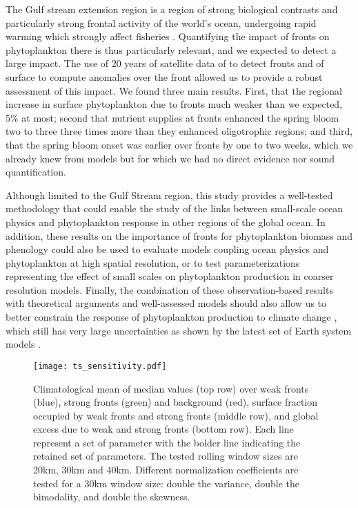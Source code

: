 \conclusions{}

The Gulf stream extension region is a region of strong biological contrasts and particularly strong frontal activity of the world's ocean, undergoing rapid warming which strongly affect fisheries \citep{pershing_2015, neto_2021}.
Quantifying the impact of fronts on phytoplankton there is thus particularly relevant, and we expected to detect a large impact.
The use of 20 years of satellite data of  to detect fronts and of surface  to compute anomalies over the front allowed us to provide a robust assessment of this impact.
We found three main results.
First, that the regional increase in surface phytoplankton due to fronts much weaker than we expected, 5\% at most; second that nutrient supplies at fronts enhanced the spring bloom two to three three times more than they enhanced oligotrophic regions; and third, that the spring bloom onset was earlier over fronts by one to two weeks, which we already knew from models \citep{karleskind_2011, mahadevan_2012} but for which we had no direct evidence nor sound quantification.

Although limited to the Gulf Stream region, this study provides a well-tested methodology that could enable the study of the links between small-scale ocean physics and phytoplankton response in other regions of the global ocean.
In addition, these results on the importance of fronts for phytoplankton biomass and phenology could also be used to evaluate models coupling ocean physics and phytoplankton at high spatial resolution, or to test parameterizations representing the effect of small scales on phytoplankton production in coarser resolution models.
Finally, the combination of these observation-based results with theoretical arguments and well-assessed models should also allow us to better constrain the response of phytoplankton production to climate change \citep{couespel_2021}, which still has very large uncertainties as shown by the latest set of Earth system models \citep{kwiatkowski_2020}.



\appendixfigures{}

\begin{figure*}
 \texttt{[image: ts\_sensitivity.pdf]}
 \caption{
   Climatological mean of  median values (top row) over weak fronts (blue), strong fronts (green) and background (red), surface fraction occupied by weak fronts and strong fronts (middle row), and global  excess due to weak and strong fronts (bottom row).
   Each line represent a set of parameter with the bolder line indicating the retained set of parameters.
   The tested rolling window sizes are 20km, 30km and 40km.
   Different normalization coefficients are tested for a 30km window size: double the variance, double the bimodality, and double the skewness.
 }%
 \label{fig:ts-sensitivity}
\end{figure*}


